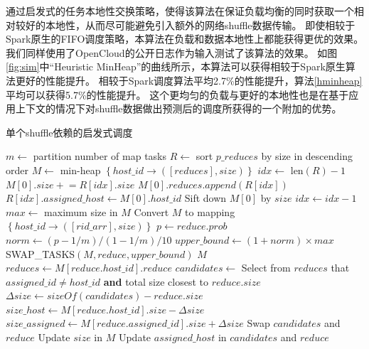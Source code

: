 通过启发式的任务本地性交换策略，使得该算法在保证负载均衡的同时获取一个相对较好的本地性，从而尽可能避免引入额外的网络shuffle数据传输。
即使相较于Spark原生的FIFO调度策略\cite{sparksource}，本算法在负载和数据本地性上都能获得更优的效果。
我们同样使用了OpenCloud的公开日志作为输入测试了该算法的效果。
如图\ref{fig:sim}中“Heuristic MinHeap”的曲线所示，本算法可以获得相较于Spark原生算法更好的性能提升。
相较于Spark调度算法平均2.7\%的性能提升，算法\ref{hminheap}平均可以获得5.7\%的性能提升。
这个更均匀的负载与更好的本地性也是在基于应用上下文的情况下对shuffle数据做出预测后的调度所获得的一个附加的优势。

\begin{algorithm}[H]
\caption{单个shuffle依赖的启发式调度}
\label{hminheap}
	\begin{algorithmic}[1]
	\small
		\State $m\gets$ partition number of map tasks
		\State $R\gets$ sort $p\_reduces$ by size in descending order
		\State $M\gets$ min-heap $\left\{ host\_id \rightarrow \left( \left[ reduces \right], size \right) \right\}$
		\State $idx\gets$ len$\left(R\right) - 1$
		\State $M\left[0\right].size \mathrel{+}= R\left[idx\right].size$
		\State $M\left[0\right].reduces.append\left(R\left[idx\right]\right)$
		\State $R\left[idx\right].assigned\_host \gets M \left[0\right].host\_id$
		\State Sift down $M\left[0\right]$ by $size$
		\State $idx\gets idx-1$
		\EndWhile
		\State $max\gets$ maximum size in $M$
		\State Convert $M$ to mapping $\left\{ host\_id \rightarrow \left( \left[ rid\_arr \right], size \right) \right\}$
				\State $p\gets reduce.prob$
				\State $norm\gets \left(p-1/m\right)/\left(1-1/m\right)/10$
				\State $upper\_bound \gets \left(1 + norm\right) \times max$
				\State SWAP\_TASKS$\left(M, reduce, upper\_bound\right)$
			\EndIf
		\EndFor
		\Return $M$
	\EndProcedure
		\State $reduces \gets M\left[reduce.host\_id\right].reduce$	
		\State $candidates \gets$ Select from $reduces$ that $assigned\_id \neq host\_id$ \textbf{and} total size closest to $reduce.size$
		\State $\Delta size \gets sizeOf\left(candidates\right) - reduce.size$
		\State $size\_host \gets M\left[reduce.host\_id\right].size - \Delta size$
		\State $size\_assigned \gets M\left[reduce.assigned\_id\right].size + \Delta size$
			\State Swap $candidates$ and $reduce$
			\State Update $size$ in $M$
			\State Update $assigned\_host$ in $candidates$ and $reduce$
		\EndIf
	\EndProcedure
	\end{algorithmic}
\end{algorithm}

